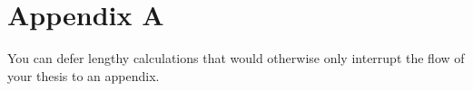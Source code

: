 \chapter{Appendix A} \label{AppendixA}

You can defer lengthy calculations that would otherwise only interrupt
the flow of your thesis to an appendix.
